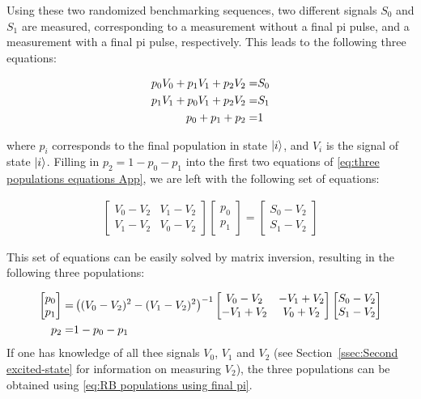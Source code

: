      Using these two randomized benchmarking sequences, two different signals $S_0$ and $S_1$ are measured, corresponding to a measurement without a final pi pulse, and a measurement with a final pi pulse, respectively. This leads to the following three equations:

      \begin{align}
        p_0 V_0 + p_1 V_1 + p_2 V_2 = & S_0 \notag\\
        p_1 V_1 + p_0 V_1 + p_2 V_2 = & S_1 \notag\\
        p_0 + p_1 + p_2 = &   1
        \label{eq:three populations equations App}
      \end{align}

      where $p_i$ corresponds to the final population in state $\ket{i}$, and $V_i$ is the signal of state $\ket{i}$.  Filling in $p_2 = 1 - p_0 - p_1$ into the first two equations of \ref{eq:three populations equations App}, we are left with the following set of equations:

      \begin{align}
        \begin{bmatrix}
          V_0 - V_2 & V_1 - V_2 \\
          V_1 - V_2 & V_0 - V_2
        \end{bmatrix}
        \begin{bmatrix}
          p_0 \\
          p_1
        \end{bmatrix}
        =
        \begin{bmatrix}
          S_0 - V_2 \\
          S_1 - V_2
        \end{bmatrix}
      \end{align}

      This set of equations can be easily solved by matrix inversion, resulting in the following three populations:

      \begin{align}
        \begin{bmatrix}
          p_0 \\
          p_1
        \end{bmatrix}
        = &
        \left((V_0-V_2)^2 - (V_1 - V_2)^2\right)^{-1}
        \begin{bmatrix}
          V_0 - V_2 & -V_1 + V_2 \\
          -V_1 + V_2 & V_0 + V_2
        \end{bmatrix}
        \begin{bmatrix}
          S_0 - V_2 \\
          S_1 - V_2
        \end{bmatrix} \notag\\
        p_2 = & 1 - p_0 - p_1
        \label{eq:RB populations using final pi}
      \end{align}
      If one has knowledge of all thee signals $V_0$, $V_1$ and $V_2$ (see Section~\ref{ssec:Second excited-state} for information on measuring $V_2$), the three populations can be obtained using \ref{eq:RB populations using final pi}.


